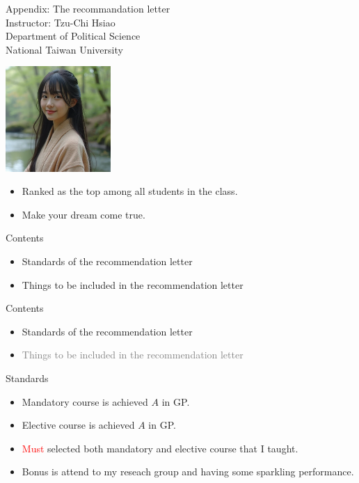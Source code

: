 \documentclass{beamer}
\title{}
\author{}
\date{}
\begin{document}
\begin{frame}
\begin{center}
\Large{Appendix: The recommandation letter} \\
\vspace{3em}
\normalsize{Instructor: Tzu-Chi Hsiao} \\
\vspace{3em}
\small{Department of Political Science} \\
\vspace{1em}
\small{National Taiwan University} \\
\end{center}
\end{frame}
\begin{frame}{}
\begin{center}
\includegraphics[width=0.3\textwidth]{letter.png} \\
\end{center}
\begin{itemize}
\item Ranked as the top among all students in the class.
\item Make your dream come true.
\end{itemize}
\end{frame}
\begin{frame}{Contents}
\begin{itemize}
\item Standards of the recommendation letter
\item Things to be included in the recommendation letter
\end{itemize}
\end{frame}
\begin{frame}{Contents}
\begin{itemize}
\item Standards of the recommendation letter
\item \textcolor{gray}{Things to be included in the recommendation letter}
\end{itemize}
\end{frame}
\begin{frame}{Standards}
\begin{itemize}
\item Mandatory course is achieved $A$ in GP.
\item Elective course is achieved $A$ in GP.
\item \textcolor{red}{Must} selected both mandatory and elective course that I taught.
\item Bonus is attend to my reseach group and having some sparkling performance.
\end{itemize}
\end{frame}
\end{document}
